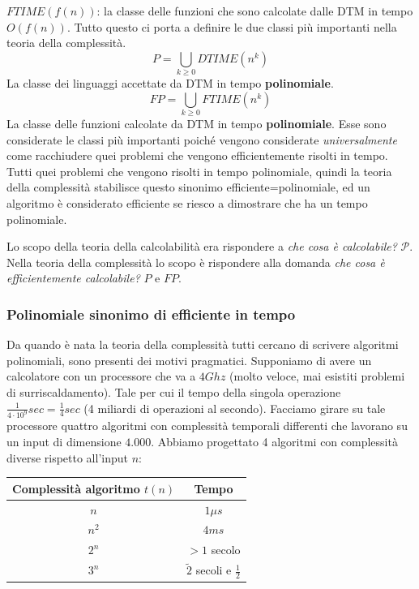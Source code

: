 \documentclass{article}
\begin{document}
$FTIME(f(n))$: la classe delle funzioni che sono calcolate dalle DTM in tempo $O(f(n))$. Tutto
questo ci porta a definire le due classi più importanti nella teoria della complessità.\mbox{}\newline
$$P=\bigcup_{k\geq 0}DTIME(n^k)$$
La classe dei linguaggi accettate da DTM in tempo \textbf{polinomiale}.
$$FP=\bigcup_{k\geq 0}FTIME(n^k)$$
La classe delle funzioni calcolate da DTM in tempo \textbf{polinomiale}.
Esse sono considerate le classi più importanti poiché vengono considerate \textit{universalmente} come
racchiudere quei problemi che vengono efficientemente risolti in tempo. Tutti quei problemi
che vengono risolti in tempo polinomiale, quindi la teoria della complessità stabilisce
questo sinonimo efficiente=polinomiale, ed un algoritmo è considerato efficiente
se riesco a dimostrare che ha un tempo polinomiale.

Lo scopo della teoria della calcolabilità era rispondere a \textit{che cosa è calcolabile?}
$\mathcal{P}$. Nella teoria della complessità lo scopo è rispondere alla domanda
\textit{che cosa è efficientemente calcolabile?} $P$ e $FP$.

\subsubsection{Polinomiale sinonimo di efficiente in tempo}
Da quando è nata la teoria della complessità tutti cercano di scrivere algoritmi
polinomiali, sono presenti dei motivi pragmatici. Supponiamo di avere un calcolatore
con un processore che va a $4Ghz$ (molto veloce, mai esistiti problemi di surriscaldamento).
Tale per cui il tempo della singola operazione $\frac{1}{4\cdot 10^9}sec=\frac{1}{4}sec$ (4
miliardi di operazioni al secondo).
Facciamo girare su tale processore quattro algoritmi con complessità temporali differenti che lavorano su un
input di dimensione $4.000$. Abbiamo progettato 4 algoritmi con complessità diverse rispetto
all'input $n$:
\begin{center}
    \begin{tabular}{c|c}
        Complessità algoritmo $t(n)$ & Tempo \\
        \midrule
        $n$ & $1\mu s$\\
        $n^2$ & $4ms$ \\
        $2^n$ & $>1$ secolo \\
        $3^n$ & $\tilde 2$ secoli e $\frac{1}{2}$
    \end{tabular}
\end{center}
\end{document}

